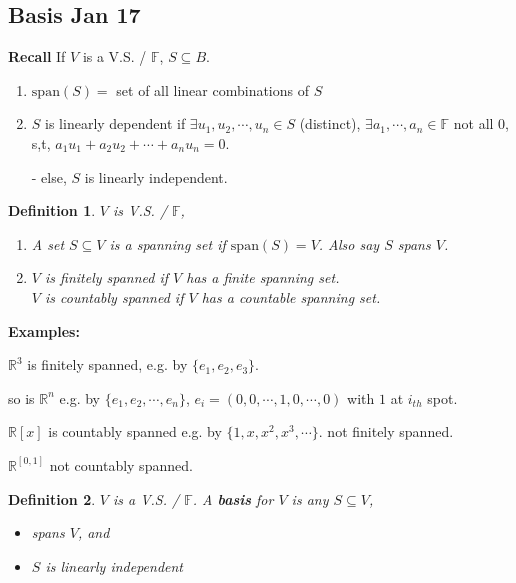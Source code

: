 \documentclass[12pt]{article}
\theoremstyle{plain}
\newtheorem{definition}{Definition}[subsection]
\newcommand{\Span}{\mathrm{span}}
\newcommand{\mR}{{\mathbb{R}}}
\newcommand{\mF}{{\mathbb{F}}}
\begin{document}
	\subsection{Basis Jan 17}

	\textbf{Recall} If $V$ is a V.S. / $\mF$, $S \subseteq B$. 
	\begin{enumerate}
		\item $\Span(S) = $ set of all linear combinations of $S$
		\item $S$ is linearly dependent if $\exists u_1, u_2,\cdots, u_n \in S$
			(distinct), $\exists a_1, \cdots, a_n \in \mF$ not all $0$, 
			s,t, $a_1u_1+a_2u_2+\cdots+a_nu_n = 0$. 

			- else, $S$ is linearly independent. \\
	\end{enumerate}
	
	\begin{definition}
		$V$ is V.S. / $\mF$, 
		\begin{enumerate}
			\item A set $S\subseteq V$ is a spanning set if $\Span(S) = V$. 
				Also say $S$ spans $V$. 
			\item $V$ is finitely spanned if $V$ has a finite spanning set.\\
				$V$ is countably spanned if $V$ has a countable spanning set.\\	
		\end{enumerate}
	\end{definition}

	{\color{Brown}
		\textbf{Examples: }
		
		$\mR^3$ is finitely spanned, e.g. by $\{e_1, e_2, e_3\}$. 

		so is $\mR^n$ e.g. by $\{e_1, e_2, \cdots, e_n\}$,
		$e_i = (0, 0, \cdots, 1, 0,\cdots, 0)$ with $1$ at $i_{th}$ spot.

		$\mathbb{R}[x]$ is countably spanned e.g. by $\{1,x,x^2,x^3,\cdots\}$.
		not finitely spanned. 

		$\mathbb{R}^[0,1]$ not countably spanned. \\
	}

	\begin{definition}
		$V$ is a V.S. / $\mF$.
		A \textbf{basis} for $V$ is any $S\subseteq V$, 
		\begin{itemize}
			\item spans $V$, and 
			\item $S$ is linearly independent \\
		\end{itemize}
	\end{definition}
	
\end{document}
